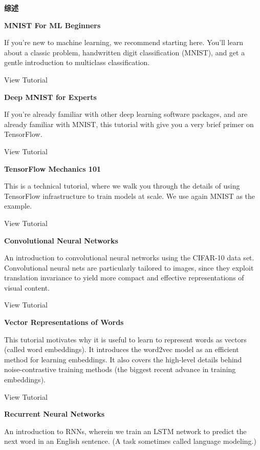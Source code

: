 



\textbf{综述}

\textbf{MNIST For ML Beginners}

If you're new to machine learning, we recommend starting here. You'll learn about a classic problem, handwritten digit classification (MNIST), and get a gentle introduction to multiclass classification.

View Tutorial

\textbf{Deep MNIST for Experts}

If you're already familiar with other deep learning software packages, and are already familiar with MNIST, this tutorial with give you a very brief primer on TensorFlow.

View Tutorial

\textbf{TensorFlow Mechanics 101}

This is a technical tutorial, where we walk you through the details of using TensorFlow infrastructure to train models at scale. We use again MNIST as the example.

View Tutorial

\textbf{Convolutional Neural Networks}

An introduction to convolutional neural networks using the CIFAR-10 data set. Convolutional neural nets are particularly tailored to images, since they exploit translation invariance to yield more compact and effective representations of visual content.

View Tutorial

\textbf{Vector Representations of Words}

This tutorial motivates why it is useful to learn to represent words as vectors (called word embeddings). It introduces the word2vec model as an efficient method for learning embeddings. It also covers the high-level details behind noise-contrastive training methods (the biggest recent advance in training embeddings).

View Tutorial

\textbf{Recurrent Neural Networks}

An introduction to RNNs, wherein we train an LSTM network to predict the next word in an English sentence. (A task sometimes called language modeling.)

